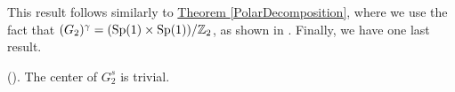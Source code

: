 \noindent This result follows similarly to \hyperref[PolarDecomposition]{Theorem \ref*{PolarDecomposition}}, where we use the fact that $(G_2)^\gamma = (\textup{Sp}(1) \times \textup{Sp}(1))/\mathbb{Z}_2$, as shown in \cite[Theorem 1.10.1]{Yok25}. Finally, we have one last result.\\

\noindent\begin{theorem}\textup{(\cite[Theorem 1.13.2]{Yok25}).} The center of $G_2^s$ is trivial.\\
\end{theorem}

\newpage

\newpage
\renewcommand\thesection{R}
\begingroup
\setlength{\emergencystretch}{.5em}
\printbibliography[heading=none]
\endgroup

